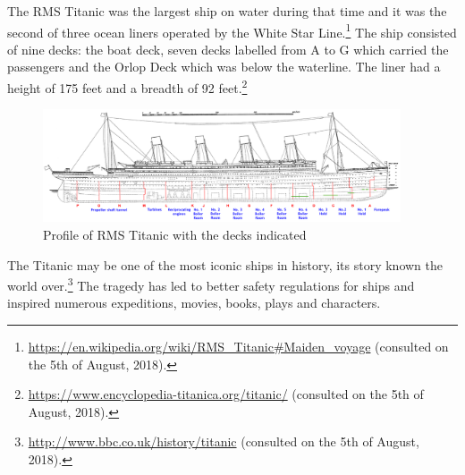 \documentclass[11pt]{article}
\begin{document}
The RMS Titanic was the largest ship on water during that time and it was the second of three  ocean liners operated by the White Star Line.\footnote{\url{https://en.wikipedia.org/wiki/RMS\_Titanic\#Maiden\_voyage} (consulted on the 5th of August, 2018).} The ship consisted of nine decks: the boat deck, seven decks labelled from A to G which carried the passengers and the Orlop Deck which was below the waterline. The liner had a height of 175 feet and a breadth of 92 feet.\footnote{\url{https://www.encyclopedia-titanica.org/titanic/} (consulted on the 5th of August, 2018).} 

\begin{figure}[htbp]
\centering
\includegraphics[width=400px]{./TitanicProfile.png}
\caption{\label{tab:titanicprofile}
Profile of RMS Titanic with the decks indicated}
\end{figure} 

The Titanic may be one of the most iconic ships in history, its story known the world over.\footnote{\url{http://www.bbc.co.uk/history/titanic} (consulted on the 5th of August, 2018).} The tragedy has led to better safety regulations for ships and inspired numerous expeditions, movies, books, plays and characters.
\end{document}
